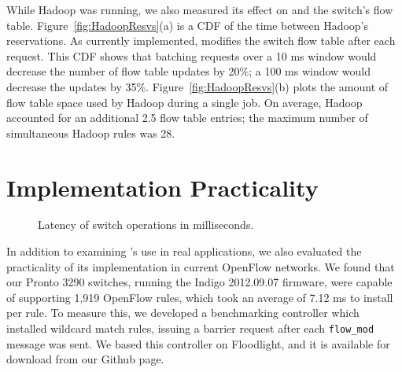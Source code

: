 While Hadoop was running, we also measured its effect on \sys and
the switch's flow table. Figure~\ref{fig:HadoopResvs}(a) is a CDF of
the time between Hadoop's reservations. As currently implemented,
\sys modifies the switch flow table after each request. This CDF shows
that batching requests over a 10 ms window would decrease the
number of flow table updates by 20\%; a 100 ms window would decrease
the updates by 35\%. Figure~\ref{fig:HadoopResvs}(b) plots the amount
of flow table space used by Hadoop during a single job. On average,
Hadoop accounted for an additional 2.5 flow table entries; the maximum
number of simultaneous Hadoop rules was 28. 

\section{Implementation Practicality}
\label{sec:Microbenchmarks}

\begin{figure}[t]
\centering
{}
\caption{Latency of switch operations in milliseconds.}
\label{fig:SwitchOpLatency}
\end{figure}

In addition to examining \sys's use in real applications, we also evaluated
the practicality of its implementation in current OpenFlow networks.
We found that our Pronto 3290 switches, running the Indigo 2012.09.07
firmware, were capable of supporting 1,919 OpenFlow rules, which took
an average of 7.12 ms to install per rule. To measure this, we developed a
benchmarking controller which installed wildcard match rules, issuing
a barrier request after each \verb/flow_mod/ message was sent. We based this
controller on Floodlight, and it is available for download from our Github page.

